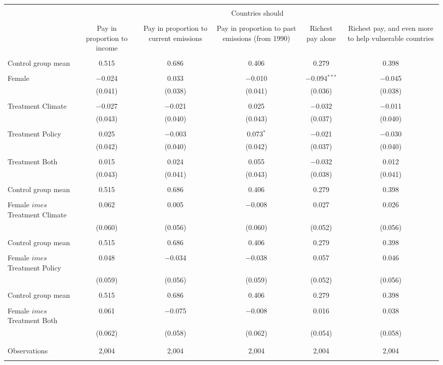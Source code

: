 
\begin{tabular}{@{\extracolsep{5pt}}lccccc} 
\\[-1.8ex]\hline 
\hline \\[-1.8ex] 
 & \multicolumn{5}{c}{Countries should} \\ 
\cline{2-6} 
\\[-1.8ex] & Pay in proportion to income & Pay in proportion to current emissions & Pay in proportion to past emissions (from 1990) & Richest pay alone & Richest pay, and even more to help vulnerable countries \\ 
\hline \\[-1.8ex] 
 Control group mean & 0.515 & 0.686 & 0.406 & 0.279 & 0.398  \\ \hline \\[-1.8ex] Female & $-$0.024 & 0.033 & $-$0.010 & $-$0.094$^{***}$ & $-$0.045 \\ 
  & (0.041) & (0.038) & (0.041) & (0.036) & (0.038) \\ 
  & & & & & \\ 
 Treatment Climate & $-$0.027 & $-$0.021 & 0.025 & $-$0.032 & $-$0.011 \\ 
  & (0.043) & (0.040) & (0.043) & (0.037) & (0.040) \\ 
  & & & & & \\ 
 Treatment Policy & 0.025 & $-$0.003 & 0.073$^{*}$ & $-$0.021 & $-$0.030 \\ 
  & (0.042) & (0.040) & (0.042) & (0.037) & (0.040) \\ 
  & & & & & \\ 
 Treatment Both & 0.015 & 0.024 & 0.055 & $-$0.032 & 0.012 \\ 
  & (0.043) & (0.041) & (0.043) & (0.038) & (0.041) \\ 
  & & & & & \\ 
 Control group mean & 0.515 & 0.686 & 0.406 & 0.279 & 0.398  \\ \hline \\[-1.8ex] Female $	imes$ Treatment Climate & 0.062 & 0.005 & $-$0.008 & 0.027 & 0.026 \\ 
  & (0.060) & (0.056) & (0.060) & (0.052) & (0.056) \\ 
  & & & & & \\ 
 Control group mean & 0.515 & 0.686 & 0.406 & 0.279 & 0.398  \\ \hline \\[-1.8ex] Female $	imes$ Treatment Policy & 0.048 & $-$0.034 & $-$0.038 & 0.057 & 0.046 \\ 
  & (0.059) & (0.056) & (0.059) & (0.052) & (0.056) \\ 
  & & & & & \\ 
 Control group mean & 0.515 & 0.686 & 0.406 & 0.279 & 0.398  \\ \hline \\[-1.8ex] Female $	imes$ Treatment Both & 0.061 & $-$0.075 & $-$0.008 & 0.016 & 0.038 \\ 
  & (0.062) & (0.058) & (0.062) & (0.054) & (0.058) \\ 
  & & & & & \\ 
\hline \\[-1.8ex] 

Observations & 2,004 & 2,004 & 2,004 & 2,004 & 2,004 \\ 
\hline 
\hline \\[-1.8ex] 
\end{tabular} 